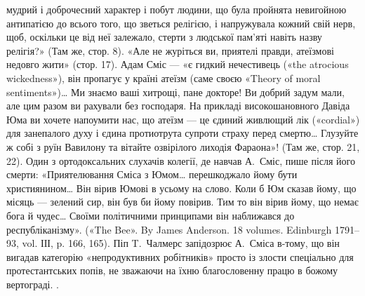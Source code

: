 {мудрий і доброчесний характер і побут людини, що була пройнята невигойною
антипатією до всього того, що зветься релігією, і напружувала
кожний свій нерв, щоб, оскільки це від неї залежало, стерти з людської
пам’яті навіть назву релігія?» (Там же, стор. 8). «Але не журіться ви,
приятелі правди, атеїзмові недовго жити» (стор. 17). Адам Сміс — «є
гидкий нечестивець («the atrocious wickedness»), він пропагує у країні
атеїзм (саме своєю «Theory of moral sentiments»)\dots{} Ми знаємо ваші хитрощі,
пане докторе! Ви добрий задум мали, але цим разом ви рахували без господаря.
На прикладі високошановного Давіда Юма ви хочете напоумити
нас, що атеїзм — це єдиний живлющий лік («cordial») для занепалого
духу і єдина протиотрута супроти страху перед смертю\dots{} Глузуйте ж
собі з руїн Вавилону та вітайте озвірілого лиходія Фараона»! (Там же,
стор. 21, 22). Один з ортодоксальних слухачів колегії, де навчав А.~Сміс,
пише після його смерти: «Приятелювання Сміса з Юмом\dots{} перешкоджало
йому бути християнином\dots{} Він вірив Юмові в усьому на слово.
Коли б Юм сказав йому, що місяць — зелений сир, він був би йому повірив.
Тим то він вірив йому, що немає бога й чудес\dots{} Своїми політичними
принципами він наближався до республіканізму». («The Bee». By James
Anderson. 18 volumes. Edinburgh 1791--93, vol. ІІІ, p. 166, 165). Піп
T.~Чалмерс запідозрює А.~Сміса в-тому, що він вигадав категорію «непродуктивних
робітників» просто із злости спеціально для протестантських
попів, не зважаючи на їхню благословенну працю в божому вертограді.
}.

